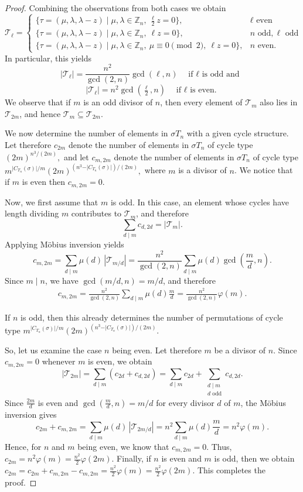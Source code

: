 \documentclass[12pt]{article}
\theoremstyle{definition}
\theoremstyle{remark}
\begin{document}
\begin{proof}
Combining the observations from both cases we obtain
\[
\mathcal{T}_\ell =
\begin{cases}
\{\tau=(\mu,\lambda,\lambda-z)\mid \mu,\lambda\in\mathbb Z_n,\ \frac{\ell}{2} z =0\}, &  \ell \text{ even}\\[4pt]
\{\tau=(\mu,\lambda,\lambda-z)\mid \mu,\lambda\in\mathbb Z_n,\ \ell z=0\}, & n \text{ odd}, \ell \text{ odd}\\[4pt]
\{\tau=(\mu,\lambda,\lambda-z)\mid \mu,\lambda\in\mathbb Z_n,\ \mu\equiv0\pmod2,\ \ell z=0\}, & n \text{ even}.
\end{cases}
\]
In particular, this yields
\[
|\mathcal{T}_\ell\vert =\frac{n^2}{\gcd(2,n)}\gcd(\ell,n) \quad \textrm{if $\ell$ is odd and }
\]
\[
|\mathcal{T}_\ell\vert =n^2\gcd(\tfrac{\ell}{2},n) \quad \textrm{if $\ell$ is even.}\]
We observe that if $m$ is an odd divisor of $n$, then every element of $\mathcal{T}_m$ also lies in $\mathcal{T}_{2m}$, and hence $\mathcal{T}_m\subseteq\mathcal{T}_{2m}$.

We now determine the number of elements in $\sigma T_n$ with a given cycle structure.
Let therefore $c_{2m}$ denote the number of elements in $\sigma T_n$ of cycle type
$(2m)^{n^3/(2m)},$
and let $c_{m,2m}$ denote the number of elements in $\sigma T_n$ of cycle type $m^{\vert C_{T_n}(\sigma)\vert /m}(2m)^{(n^3-\vert C_{T_n}(\sigma)\vert )/(2m)},$
where $m$ is a divisor of $n$. We notice that if $m$ is even then $c_{m,2m}=0$.

Now, we first assume that $m$ is odd. In this case, an element whose cycles have length dividing $m$ contributes to $\mathcal{T}_m$, and therefore
\[
\sum_{d\mid m} c_{d,2d}=\vert \mathcal{T}_m\vert .
\]
Applying Möbius inversion yields
\[
c_{m,2m}
=
\sum_{d\mid m}\mu(d)\,|\mathcal{T}_{m/d}|
=
\frac{n^2}{\gcd(2,n)}\sum_{d\mid m}\mu(d)\gcd\!\left(\frac{m}{d},n\right).
\]
Since $m\mid n$, we have $\gcd(m/d,n)=m/d$, and therefore
\begin{align}
c_{m,2m}
=
\frac{n^2}{\gcd(2,n)}
\sum_{d\mid m}\mu(d)\frac{m}{d}
=
\frac{n^2}{\gcd(2,n)}\varphi(m).
\end{align}

If $n$ is odd, then this already determines the number of permutations of cycle type $m^{\vert C_{T_n}(\sigma)\vert /m}(2m)^{(n^3-\vert C_{T_n}(\sigma)\vert )/(2m)}$.

So, let us examine the case $n$ being even.
Let therefore $m$ be a divisor of $n$. Since $c_{m,2m}=0$ whenever $m$ is even, we obtain
\[
|\mathcal{T}_{2m}|
=
\sum_{d\mid m}(c_{2d}+c_{d,2d})
=
\sum_{d\mid m}c_{2d}
+
\sum_{\substack{d\mid m\\ d\text{ odd}}}c_{d,2d}.
\]
Since $\frac{2m}{d}$ is even and $\gcd(\frac{m}{d},n)=m/d$ for every divisor $d$ of $m$, the Möbius inversion gives
\[
c_{2m}+c_{m,2m}
=
\sum_{d\mid m}\mu(d)\,|\mathcal{T}_{2m/d}|
={n^2}\sum_{d\mid m}\mu(d)\frac{m}{d}
=
n^2\varphi(m).
\]
Hence, for $n$ and $m$ being even, we know that $c_{m,2m}=0$. Thus, $c_{2m}=n^2\varphi(m)=\frac{n^2}{2}\varphi(2m).$
Finally, if $n$ is even and $m$ is odd, then we obtain $c_{2m}=c_{2m}+c_{m,2m}-c_{m,2m}=\frac{n^2}{2}\varphi(m)=\frac{n^2}{2}\varphi(2m).$
This completes the proof.


\end{proof}
\end{document}
